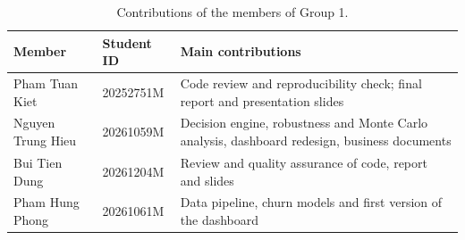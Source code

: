 \documentclass[11pt,a4paper]{article}
\begin{document}
\begin{table}[H]
\centering\small
\caption{Contributions of the members of Group 1.}\label{tab:team}
\begin{tabularx}{\linewidth}{@{}p{3.6cm}p{2.4cm}X@{}}
\toprule
\textbf{Member} & \textbf{Student ID} & \textbf{Main contributions} \\
\midrule
Pham Tuan Kiet & 20252751M & Code review and reproducibility check; final report and presentation slides \\
Nguyen Trung Hieu & 20261059M & Decision engine, robustness and Monte Carlo analysis, dashboard redesign, business documents \\
Bui Tien Dung & 20261204M & Review and quality assurance of code, report and slides \\
Pham Hung Phong & 20261061M & Data pipeline, churn models and first version of the dashboard \\
\bottomrule
\end{tabularx}
\end{table}
\end{document}

